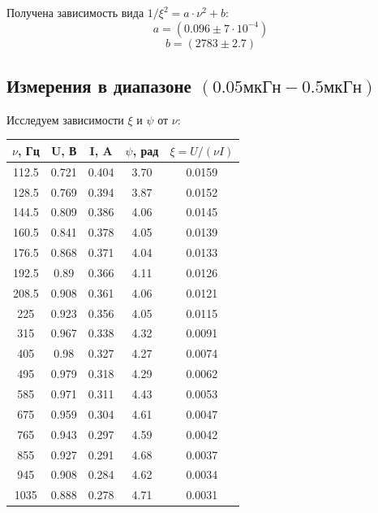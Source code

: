 \documentclass[11pt]{article}
\begin{document}
Получена зависимость вида \( 1/\xi^2 = a\cdot \nu^2 + b \):
\[ a = (0.096 \pm 7\cdot10^{-4}) \]
\[ b = (2783 \pm 2.7) \]
\subsection{Измерения в диапазоне \((0.05мкГн - 0.5мкГн)\)}
Исследуем зависимости \(\xi\) и \(\psi\) от \(\nu\):
\begin{table}[H]
    \centering
    \begin{tabular}{|c|c|c|c|c|}
    \hline
    \(\nu\), Гц & U, В  & I, A  & \(\psi\), рад & \(\xi = U/(\nu I)\) \\\hline
    112.5   & 0.721 & 0.404 & 3.70 & 0.0159\\\hline
    128.5   & 0.769 & 0.394 & 3.87 & 0.0152\\\hline
    144.5   & 0.809 & 0.386 & 4.06 & 0.0145\\\hline
    160.5   & 0.841 & 0.378 & 4.05 & 0.0139\\\hline
    176.5   & 0.868 & 0.371 & 4.04 & 0.0133\\\hline
    192.5   & 0.89  & 0.366 & 4.11 & 0.0126\\\hline
    208.5   & 0.908 & 0.361 & 4.06 & 0.0121\\\hline
    225     & 0.923 & 0.356 & 4.05 & 0.0115\\\hline
    315     & 0.967 & 0.338 & 4.32 & 0.0091\\\hline
    405     & 0.98  & 0.327 & 4.27 & 0.0074\\\hline
    495     & 0.979 & 0.318 & 4.29 & 0.0062\\\hline
    585     & 0.971 & 0.311 & 4.43 & 0.0053\\\hline
    675     & 0.959 & 0.304 & 4.61 & 0.0047\\\hline
    765     & 0.943 & 0.297 & 4.59 & 0.0042\\\hline
    855     & 0.927 & 0.291 & 4.68 & 0.0037\\\hline
    945     & 0.908 & 0.284 & 4.62 & 0.0034\\\hline
    1035    & 0.888 & 0.278 & 4.71 & 0.0031\\\hline
    \end{tabular}
\end{table}
\end{document}
